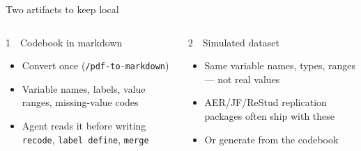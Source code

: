 \documentclass[aspectratio=169, 10pt]{beamer}
\begin{document}
\begin{frame}{Two artifacts to keep local}
\begin{columns}[t]
\begin{mckcard}[mcknavy]{1\ \ Codebook in markdown}
\footnotesize
\begin{itemize}
  \item Convert once (\texttt{/pdf-to-markdown})
  \item Variable names, labels, value ranges, missing-value codes
  \item Agent reads it before writing \texttt{recode}, \texttt{label define}, \texttt{merge}
\end{itemize}
\end{mckcard}

\begin{mckcard}[mcknavy]{2\ \ Simulated dataset}
\footnotesize
\begin{itemize}
  \item Same variable names, types, ranges --- not real values
  \item AER/JF/ReStud replication packages often ship with these
  \item Or generate from the codebook
\end{itemize}
\end{mckcard}
\end{columns}
\end{frame}
\end{document}
